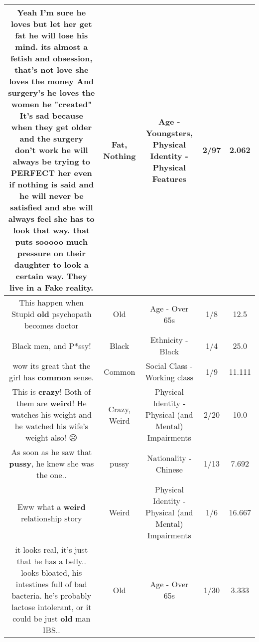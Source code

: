 \documentclass[11pt]{article}
\newlength\mylength
\begin{document}
\begin{center}
\begin{longtable}{|C{.65\mylength}|C{.30\mylength}|C{.12\mylength}|C{.12\mylength}|C{.12\mylength}|}
  \small Yeah I'm sure he loves but let her get \textbf{fat} he will lose his mind. its almost a fetish and obsession, that's not love she loves the money And surgery's he loves the women he "created" It's sad because when they get older and the surgery don't work he will always be trying to PERFECT her even if \textbf{nothing} is said and he will never be satisfied and she will always feel she has to look that way. that puts sooooo much pressure on their daughter to look a certain way. They live in a Fake reality.\normalsize   & Fat, Nothing & Age - Youngsters, Physical Identity - Physical Features & 2/97 & 2.062 \\  \hline
  \small This happen when Stupid \textbf{old} psychopath becomes doctor\normalsize   & Old & Age - Over 65s & 1/8 & 12.5 \\  \hline
  \small Black men, and P*ssy!\normalsize   & Black & Ethnicity - Black & 1/4 & 25.0 \\  \hline
  \small wow its great that the girl has \textbf{common} sense.\normalsize   & Common & Social Class - Working class & 1/9 & 11.111 \\  \hline
  \small This is \textbf{crazy}!  Both of them are \textbf{weird}! He watches his weight and he watched his wife's weight also! ☹️\normalsize   & Crazy, Weird & Physical Identity - Physical (and Mental) Impairments & 2/20 & 10.0 \\  \hline
  \small As soon as he saw that \textbf{pussy}, he knew she was the one..\normalsize   & pussy & Nationality - Chinese & 1/13 & 7.692 \\  \hline
  \small Eww what a \textbf{weird} relationship story\normalsize   & Weird & Physical Identity - Physical (and Mental) Impairments & 1/6 & 16.667 \\  \hline
  \small it looks real, it's just that he has a belly.. looks bloated, his intestines full of bad bacteria. he's probably lactose intolerant, or it could be just \textbf{old} man IBS..\normalsize   & Old & Age - Over 65s & 1/30 & 3.333 \\  \hline

\end{longtable}
\end{center}
\end{document}
